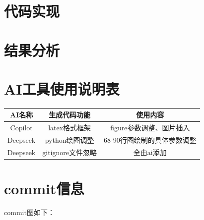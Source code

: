 \documentclass[12pt,a4paper]{article}
\begin{document}
\section{代码实现}

\newpage   
\section{结果分析}

\section{AI工具使用说明表}
\begin{table}[!htbp]
    \centering
    \begin{tabular}{|c|c|c|}
        \hline
        \textbf{AI名称} & \textbf{生成代码功能} & \textbf{使用内容} \\
        \hline
        Copilot & latex格式框架 & figure参数调整、图片插入\\
        \hline
        Deepseek & python绘图调整 & 68-90行图绘制的具体参数调整\\
        \hline
        Deepseek & gitignore文件忽略 & 全由ai添加\\
        \hline
\end{tabular}
\end{table}
\section{commit信息}
commit图如下：
\end{document}
